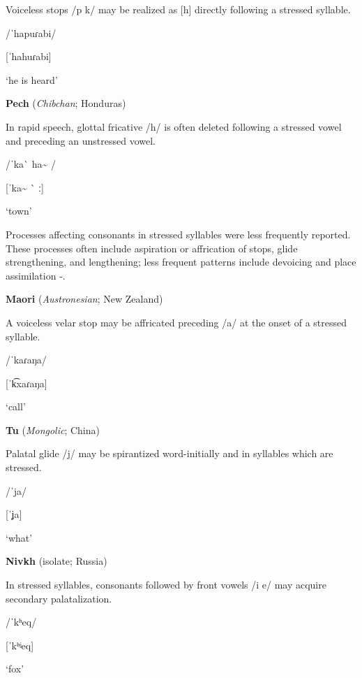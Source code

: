 Voiceless stops /p k/ may be realized as [h] directly following a stressed syllable.

/ˈhapuɾabi/

[ˈhahuɾabi]

\glt ‘he is heard’

\citep[123]{Chacon2012}
\z

\ea\label{ex:(5.21)}
  \textbf{Pech} (\textit{Chibchan}; Honduras)

In rapid speech, glottal fricative /h/ is often deleted following a stressed vowel and preceding an unstressed vowel.

/ˈka\`{} ha\~{} /

[ˈka\~{} \`{} ː]

\glt ‘town’

\citep[24]{Holt1999}
\z

  Processes affecting consonants in stressed syllables were less frequently reported. These processes often include aspiration or affrication of stops, glide strengthening, and lengthening; less frequent patterns include devoicing and place assimilation -.

\ea\label{ex:(5.22)}
  \textbf{Maori} (\textit{Austronesian}; New Zealand)

A voiceless velar stop may be affricated preceding /a/ at the onset of a stressed syllable.

/ˈkaɾaŋa/

[ˈk͡xaɾaŋa]

\glt ‘call’

\citep[521-2]{Bauer1999}

\z

\ea\label{ex:(5.23)}
  \textbf{Tu} (\textit{Mongolic}; China)

Palatal glide /j/ may be spirantized word-initially and in syllables which are stressed.

/ˈja/

[ˈʝa]

\glt ‘what’

\citep[31-2]{Slater2003}
\z

\ea\label{ex:(5.24)}
  \textbf{Nivkh} (isolate; Russia)

In stressed syllables, consonants followed by front vowels /i e/ may acquire secondary palatalization.

/ˈkʰeq/

[ˈkʰʲeq]

\glt ‘fox’

\citep[23]{Shiraishi2006}
\z


